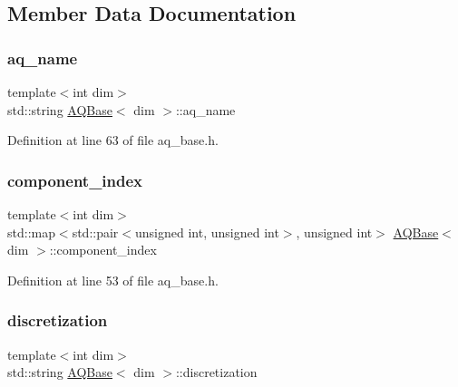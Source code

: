 \subsection{Member Data Documentation}
\mbox{\label{class_a_q_base_a3e50d2d59d1a4a2fabed3c4852f80c49}} 
\subsubsection{\texorpdfstring{aq\+\_\+name}{aq\_name}}
{\footnotesize\ttfamily template$<$int dim$>$ \\
std\+::string \hyperlink{class_a_q_base}{A\+Q\+Base}$<$ dim $>$\+::aq\+\_\+name\hspace{0.3cm}{\ttfamily [private]}}



Definition at line 63 of file aq\+\_\+base.\+h.

\mbox{\label{class_a_q_base_a0d9e9c6302e481718d62d76c09c83d2d}} 
\subsubsection{\texorpdfstring{component\+\_\+index}{component\_index}}
{\footnotesize\ttfamily template$<$int dim$>$ \\
std\+::map$<$std\+::pair$<$unsigned int, unsigned int$>$, unsigned int$>$ \hyperlink{class_a_q_base}{A\+Q\+Base}$<$ dim $>$\+::component\+\_\+index\hspace{0.3cm}{\ttfamily [protected]}}



Definition at line 53 of file aq\+\_\+base.\+h.

\mbox{\label{class_a_q_base_a6c454af11008e235340a7b8e31a02114}} 
\subsubsection{\texorpdfstring{discretization}{discretization}}
{\footnotesize\ttfamily template$<$int dim$>$ \\
std\+::string \hyperlink{class_a_q_base}{A\+Q\+Base}$<$ dim $>$\+::discretization\hspace{0.3cm}{\ttfamily [protected]}}



